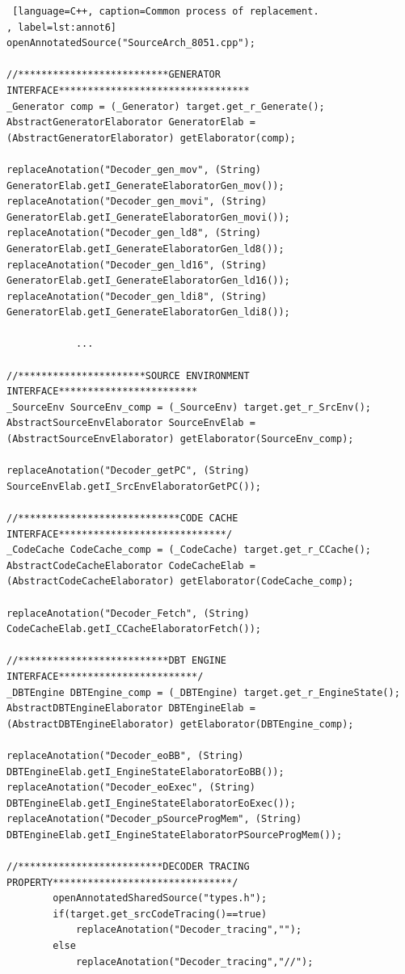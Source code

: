 \newpage
\begin{lstlisting} [language=C++, caption=Common process of replacement.
, label=lst:annot6]
openAnnotatedSource("SourceArch_8051.cpp");   
		
//**************************GENERATOR INTERFACE*********************************
_Generator comp = (_Generator) target.get_r_Generate();
AbstractGeneratorElaborator GeneratorElab = (AbstractGeneratorElaborator) getElaborator(comp);
        
replaceAnotation("Decoder_gen_mov", (String) GeneratorElab.getI_GenerateElaboratorGen_mov());
replaceAnotation("Decoder_gen_movi", (String) GeneratorElab.getI_GenerateElaboratorGen_movi());
replaceAnotation("Decoder_gen_ld8", (String) GeneratorElab.getI_GenerateElaboratorGen_ld8());
replaceAnotation("Decoder_gen_ld16", (String) GeneratorElab.getI_GenerateElaboratorGen_ld16());
replaceAnotation("Decoder_gen_ldi8", (String) GeneratorElab.getI_GenerateElaboratorGen_ldi8());

			...

//**********************SOURCE ENVIRONMENT INTERFACE************************				
_SourceEnv SourceEnv_comp = (_SourceEnv) target.get_r_SrcEnv();
AbstractSourceEnvElaborator SourceEnvElab = (AbstractSourceEnvElaborator) getElaborator(SourceEnv_comp);
		
replaceAnotation("Decoder_getPC", (String) SourceEnvElab.getI_SrcEnvElaboratorGetPC());	
				
//****************************CODE CACHE INTERFACE*****************************/
_CodeCache CodeCache_comp = (_CodeCache) target.get_r_CCache();
AbstractCodeCacheElaborator CodeCacheElab = (AbstractCodeCacheElaborator) getElaborator(CodeCache_comp);
		
replaceAnotation("Decoder_Fetch", (String) CodeCacheElab.getI_CCacheElaboratorFetch());	
			
//**************************DBT ENGINE INTERFACE************************/	
_DBTEngine DBTEngine_comp = (_DBTEngine) target.get_r_EngineState();
AbstractDBTEngineElaborator DBTEngineElab = (AbstractDBTEngineElaborator) getElaborator(DBTEngine_comp);		
		
replaceAnotation("Decoder_eoBB", (String) DBTEngineElab.getI_EngineStateElaboratorEoBB());
replaceAnotation("Decoder_eoExec", (String) DBTEngineElab.getI_EngineStateElaboratorEoExec());
replaceAnotation("Decoder_pSourceProgMem", (String) DBTEngineElab.getI_EngineStateElaboratorPSourceProgMem());
    
//*************************DECODER TRACING PROPERTY*******************************/
		openAnnotatedSharedSource("types.h");
		if(target.get_srcCodeTracing()==true)
			replaceAnotation("Decoder_tracing","");
		else
			replaceAnotation("Decoder_tracing","//");	
\end{lstlisting}

